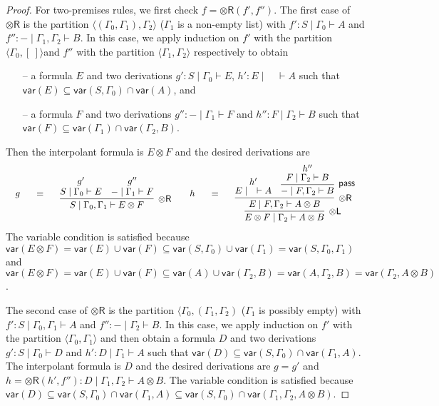 \documentclass[sn-mathphys-num]{sn-jnl}%
\newcommand{\GG}{\Gamma}
\newcommand{\vd}{\vdash}
\newcommand{\tl}{\otimes \mathsf{L}}
\newcommand{\tr}{\otimes\mathsf{R}}
\newcommand{\pass}{\mathsf{pass}}
\newcommand{\ot}{\otimes}
\newcommand{\vars}[1]{\mathsf{var}(#1)}
\theoremstyle{thmstyleone}%
\theoremstyle{thmstyletwo}%
\theoremstyle{thmstylethree}%
\begin{document}
\begin{proof}
For two-premises rules, we first check $f = \tr (f',f'')$.
The first case of $\tr$ is the partition $\langle (\GG_0, \GG_1), \GG_2 \rangle$ ($\GG_1$ is a non-empty list) with $f' : S \mid \GG_0 \vd A$ and $f'': {-} \mid \GG_1, \GG_2 \vd B$.
In this case, we apply induction on $f'$ with the partition $\langle \GG_0 , [\ ] \rangle $and $f''$ with the partition $\langle \GG_1 , \GG_2 \rangle$ respectively to obtain
\begin{itemize}
  \item[--] a formula $E$ and two derivations $g' : S \mid \GG_0 \vd E$, $h' : E \mid \quad \vd A$ such that $\vars{E} \subseteq \vars{S, \GG_0} \cap \vars{A}$, and
  \item[--] a formula $F$ and two derivations $g'' : {-} \mid \GG_1 \vd F$ and $h'' : F \mid \GG_2 \vd B$ such that $\vars{F} \subseteq \vars{\GG_1} \cap \vars{\GG_2, B}$.
\end{itemize}
Then the interpolant formula is $E \ot F$ and the desired derivations are
\begin{displaymath}
  \begin{array}{c}
  \begin{array}{c}
    g
  \end{array}
  \quad
  =
  \quad
  \begin{array}{c}
    \infer[\tr]{S \mid \GG_0 , \GG_1 \vd E \ot F}{
      \deduce{S \mid \GG_0 \vd E}{g'}
      &
      \deduce{{-} \mid \GG_1 \vd F}{g''}
    }
  \end{array}
    \quad
    \begin{array}{c}
      h
    \end{array}
    \quad
    =
    \quad
    \begin{array}{c}
      \infer[\tl]{E \ot F \mid \GG_2 \vd A \ot B}{
      \infer[\tr]{E \mid F , \GG_2 \vd A \ot B}{
        \deduce{E \mid \quad \vd A}{h'}
        &
        \infer[\pass]{{-} \mid F , \GG_2 \vd B}{
          \deduce{F \mid \GG_2 \vd B}{h''}
        }
      }
    }
    \end{array}
  \end{array}
\end{displaymath}
The variable condition is satisfied because $\vars{E \ot F} = \vars{E} \cup \vars{F} \subseteq \vars{S , \GG_0} \cup \vars{\GG_1} = \vars{S, \GG_0 , \GG_1}$ and $\vars{E \ot F} = \vars{E} \cup \vars{F} \subseteq \vars{A} \cup \vars{\GG_2 , B} = \vars{A, \GG_2 , B} = \vars{\GG_2, A \ot B}$.

The second case of $\tr$ is the partition $\langle \GG_0, (\GG_1 , \GG_2)$ ($\GG_1$ is possibly empty) with $f' : S \mid \GG_0 , \GG_1 \vd A$ and $f'' : {-} \mid \GG_2 \vd B$.
In this case, we apply induction on $f'$ with the partition $\langle \GG_0 , \GG_1 \rangle$ and then obtain a formula $D$ and two derivations $g' : S \mid \GG_0 \vd D$ and $h' : D \mid \GG_1 \vd A$ such that $\vars{D} \subseteq \vars{S, \GG_0} \cap \vars{\GG_1 , A}$.
The interpolant formula is $D$ and the desired derivations are $g = g'$ and $h = \tr (h' , f'') : D \mid \GG_1 , \GG_2 \vd A \ot B$.
The variable condition is satisfied because $\vars{D} \subseteq \vars{S, \GG_0} \cap \vars{\GG_1 , A} \subseteq \vars{S, \GG_0} \cap \vars{\GG_1 , \GG_2 , A \ot B}$.


\end{proof}
\end{document}
